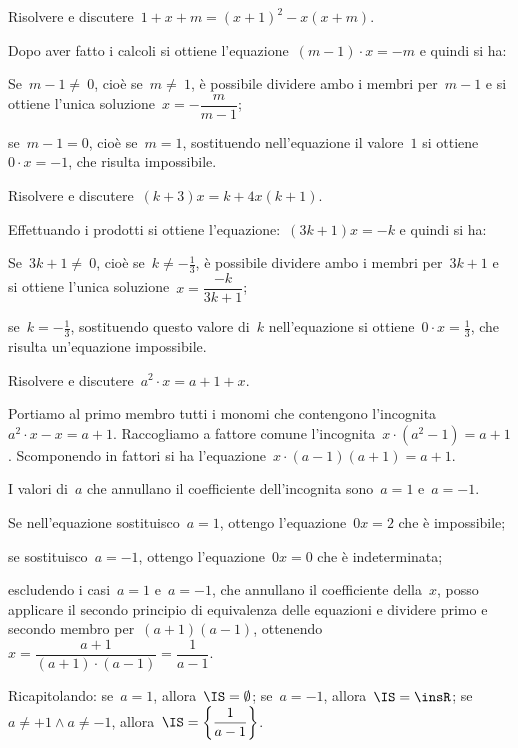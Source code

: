 \begin{exrig}
 \begin{esempio}
Risolvere e discutere~$1+x+m=(x+1)^{2}-x(x+m)$.

Dopo aver fatto i calcoli si ottiene l'equazione~$(m-1)\cdot x=-m$ e quindi si ha:
\begin{itemize*}
 \item Se~$m-1\neq~0$, cioè se~$m\neq~1$, è possibile dividere ambo i membri per~$m-1$ e si ottiene l'unica soluzione~$x=-{\dfrac{m}{m-1}}$;
 \item se~$m-1=0$, cioè se~$m=1$, sostituendo nell'equazione il valore~$1$ si ottiene~$0\cdot x=-1$, che risulta impossibile.
\end{itemize*}
 \end{esempio}

 \begin{esempio}
Risolvere e discutere~$(k+3)x=k+4x(k+1)$.

Effettuando i prodotti si ottiene l'equazione:~$(3k+1)x=-k$ e quindi si ha:
\begin{itemize*}
 \item Se~$3k+1\neq~0$, cioè se~$k\neq -{\frac{1}{3}}$, è possibile dividere ambo i membri per~$3k+1$ e si ottiene l'unica soluzione~$x=\dfrac{-k}{3k+1}$;
 \item se~$k=-{\frac{1}{3}}$, sostituendo questo valore di~$k$ nell'equazione si ottiene~$0\cdot x=\frac{1}{3}$, che risulta un'equazione impossibile.
\end{itemize*}
 \end{esempio}

 \begin{esempio}
Risolvere e discutere~$a^{2}\cdot x=a+1+x$.

Portiamo al primo membro tutti i monomi che contengono l'incognita~$a^{2}\cdot x-x=a+1$.
Raccogliamo a fattore comune l'incognita~$x\cdot \left(a^{2}-1\right)=a+1$.
Scomponendo in fattori si ha l'equazione~$x\cdot \left(a-1\right)\left(a+1\right)=a+1$.

I valori di~$a$ che annullano il coefficiente dell'incognita sono~$a=1$ e~$a=-1$.
\begin{itemize*}
 \item Se nell'equazione sostituisco~$a=1$, ottengo l'equazione~$0x=2$ che è impossibile;
 \item se sostituisco~$a=-1$, ottengo l'equazione~$0x=0$ che è indeterminata;
 \item escludendo i casi~$a=1$ e~$a=-1$, che annullano il coefficiente della~$x$, posso applicare il secondo principio
    di equivalenza delle equazioni e dividere primo e secondo membro per~$(a+1)(a-1)$, ottenendo~$x=\dfrac{a+1}{\left(a+1\right)\cdot \left(a-1\right)}=\dfrac{1}{a-1}$.
\end{itemize*}
 \end{esempio}
Ricapitolando:
se~$a=1$, allora~$\IS=\emptyset$; se~$a=-1$, allora~$\IS=\insR$; se~$a\neq +1\wedge a\neq -1$, allora~$\IS=\left\{\dfrac{1}{a-1}\right\}$.
\end{exrig}


